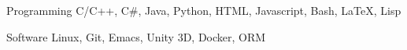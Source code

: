 

\begin{cvskills}

  \cvskill
    {Programming} %
    {C/C++, C\#, Java, Python, HTML, Javascript, Bash, LaTeX, Lisp}

  \cvskill
    {Software} %
    {Linux, Git, Emacs, Unity 3D, Docker, ORM} %

\end{cvskills}
